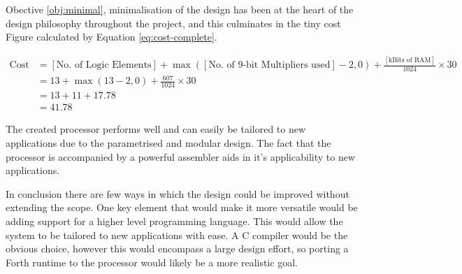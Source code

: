 Obective \ref{obj:minimal}, minimalisation of the design has been at the heart of the design philosophy throughout the project, and this culminates in the tiny cost Figure calculated by Equation \ref{eq:cost-complete}.

\begin{align}
\text{Cost} &= [\text{No. of Logic Elements}] + \max([\text{No. of 9-bit Multipliers used}] -2, 0) + \frac{ [\text{kBits of RAM}]}{1024} \times 30 \nonumber \\
&= 13 +  \max(13 -2, 0) + \frac{607}{1024} \times 30  \nonumber \\
&= 13 + 11 + 17.78  \nonumber \\
&= 41.78
\label{eq:cost-complete}
\end{align}

The created processor performs well and can easily be tailored to new applications due to the parametrised and modular design. The fact that the processor is accompanied by a powerful assembler aids in it's applicability to new applications.

In conclusion there are few ways in which the design could be improved without extending the scope. One key element that would make it more versatile would be adding support for a higher level programming language. This would allow the system to be tailored to new applications with ease. A C compiler would be the obvious choice, however this would encompass a large design effort, so porting a Forth runtime to the processor would likely be a more realistic goal.
